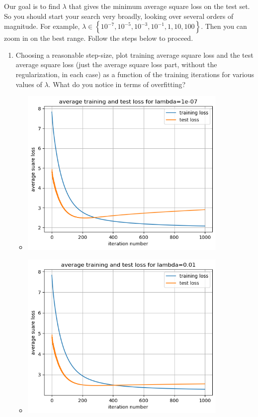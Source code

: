 \documentclass{article}
\begin{document}
Our goal is to find $\lambda$
that gives the minimum average square loss on the test set. So you should start your search very broadly, looking
over several orders of magnitude. For example, $\lambda\in\left\{ 10^{-7},10^{-5},10^{-3},10^{-1},1,10,100\right\} $.
Then you can zoom in on the best range. Follow the steps below to proceed.
\begin{enumerate}
\setcounter{enumi}{\value{saveenum}}
\item 
Choosing a reasonable step-size, plot training average square loss and
the test average square loss (just the average square loss part, without the regularization, in each case) as a function of the training iterations for various values of $\lambda$. What do you notice in terms of overfitting?
\begin{itemize}
\item\includegraphics[width=10cm]{homework/homework_2/immages/17_1.png}
\item\includegraphics[width=10cm]{homework/homework_2/immages/17_2.png}

\end{itemize}
\end{enumerate}
\end{document}

